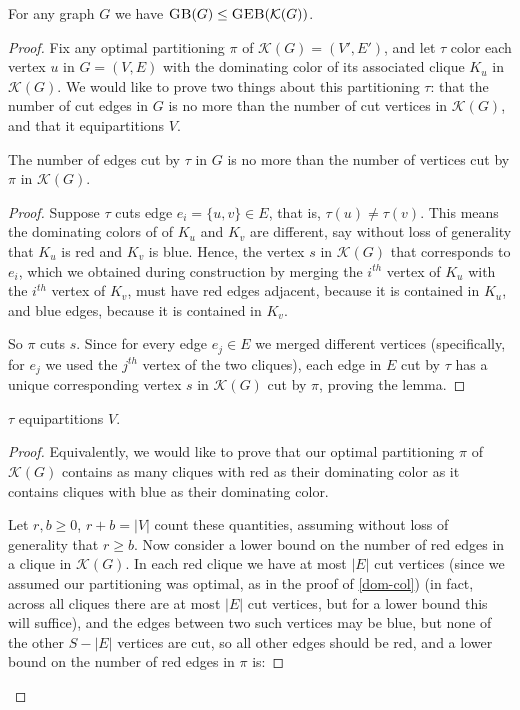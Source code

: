 	\begin{proposition}
		\label{gb-leq-geb}
		For any graph $G$ we have $\textsc{GB}(G) \leq \textsc{GEB}(\mathcal{K}(G))$.
	\end{proposition}
	\begin{proof}
		Fix any optimal partitioning $\pi$ of $\mathcal{K}(G) = (V', E')$, and
		let $\tau$ color each vertex $u$ in $G = (V, E)$ with the dominating
		color of its associated clique $K_u$ in $\mathcal{K}(G)$. We would
		like to
		prove two things about this partitioning $\tau$:
		that the number of cut edges in $G$ is no more than the number of
		cut vertices in $\mathcal{K}(G)$, and that it equipartitions $V$.


		\begin{lemma}
			\label{gb-leq-geb-lemma-1}
			The number of edges cut by $\tau$ in $G$ is no more than the number
			of vertices cut by $\pi$ in $\mathcal{K}(G)$.
		\end{lemma}
		\begin{proof}
			Suppose $\tau$ cuts edge $e_i = \{u, v\} \in E$, that is,
			$\tau(u) \neq \tau(v)$. This means the dominating colors of
			of $K_u$ and $K_v$ are different, say without loss of generality
			that $K_u$ is red and $K_v$ is blue. Hence, the vertex $s$ in
			$\mathcal{K}(G)$ that
			corresponds to $e_i$, which we obtained during construction
			by merging the $i^{th}$
			vertex of $K_u$ with the $i^{th}$ vertex of $K_v$, must have
			red edges adjacent, because it is contained in $K_u$, and blue
			edges, because it is contained in $K_v$.

			So $\pi$ cuts $s$.
			Since for every edge $e_j \in E$ we merged different
			vertices (specifically, for $e_j$ we used the $j^{th}$ vertex of
			the two cliques), each edge in $E$ cut by $\tau$ has a unique
			corresponding vertex $s$ in $\mathcal{K}(G)$ cut by $\pi$,
			proving the lemma.
		\end{proof}
		\begin{lemma}
			\label{gb-leq-geb-lemma-2}
			$\tau$ equipartitions $V$.
		\end{lemma}
		\begin{proof}
			Equivalently, we would like to prove that our optimal partitioning
			$\pi$ of $\mathcal{K}(G)$ contains as many cliques with red as
			their dominating color as it contains cliques with blue as their
			dominating color.

			Let $r,b \geq 0$, $r+b=|V|$ count these quantities, assuming
			without loss of generality that $r \geq b$. Now consider a lower
			bound on the number of red edges in a clique in $\mathcal{K}(G)$.
			In each red clique we have at most
			$|E|$ cut vertices (since we assumed our partitioning was optimal,
			as in the proof of \autoref{dom-col}) (in fact,
			across all cliques there are at most $|E|$ cut vertices, but for a
			lower bound this will suffice), and the edges between two such
			vertices may be blue, but none of the other $S - |E|$ vertices are
			cut, so all other edges should be red, and a lower
			bound on the number of red edges in $\pi$ is:


\end{proof}
\end{proof}
